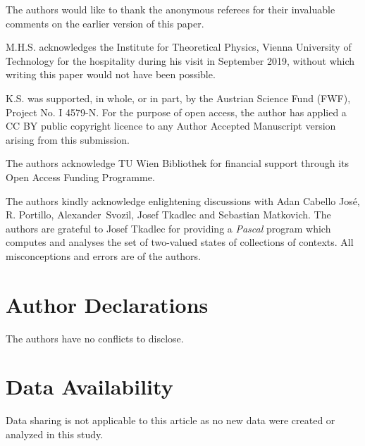 \documentclass[%
12pt,
prereprint,
showpacs,
showkeys,
preprintnumbers,
amsmath,amssymb,
aps,
pra,
longbibliography,
notitlepage
]{revtex4-1}
\theoremstyle{definition}
\begin{document}
	
	
	
	\begin{acknowledgments}
		The authors would like to thank the anonymous referees for their  invaluable comments on the earlier version of this paper.
		
	M.H.S. acknowledges the Institute for Theoretical Physics, Vienna University of Technology for the hospitality during his visit in September 2019, without which writing this paper would not have been possible.
		
		K.S. was supported, in whole, or in part, by the Austrian Science Fund (FWF), Project No. I 4579-N. For the purpose of open access, the author has applied a CC BY public copyright licence to any Author Accepted Manuscript version arising from this submission.

The authors acknowledge TU Wien Bibliothek for financial support through its Open Access Funding Programme.
		
		
		
		The authors kindly acknowledge enlightening discussions with Adan Cabello Jos\'{e}, R. Portillo,
		Alexander~Svozil, Josef Tkadlec and Sebastian Matkovich.
		The authors are grateful to Josef Tkadlec for providing a {\em Pascal} program
		which computes and analyses the set of two-valued states of collections of contexts.
		All misconceptions and errors are of the authors.
	\end{acknowledgments}
	
	\section*{Author Declarations}
	The authors have no conflicts to disclose.
	
	\section*{Data Availability}
	Data sharing is not applicable to this article as no new data were created or analyzed in this study.
	
	
	
	
\end{document}
